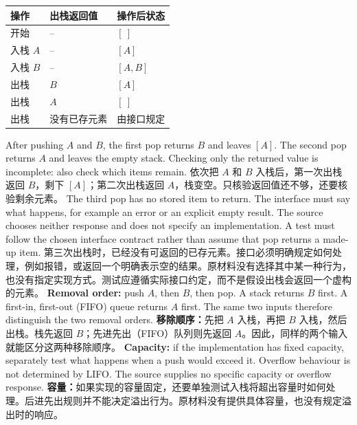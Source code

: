  {\begin{tabularx}{\linewidth}{@{}l l X@{}}\toprule 操作 & 出栈返回值 & 操作后状态\\\midrule
 开始 & -- & $[\ ]$\\
 入栈 $A$ & -- & $[A]$\\
 入栈 $B$ & -- & $[A,B]$\\
 出栈 & $B$ & $[A]$\\
 出栈 & $A$ & $[\ ]$\\
 出栈 & 没有已存元素 & 由接口规定\\\bottomrule\end{tabularx}}
 {After pushing $A$ and $B$, the first pop returns $B$ and leaves $[A]$. The second pop returns $A$ and leaves the empty stack. Checking only the returned value is incomplete: also check which items remain.}
 {依次把 $A$ 和 $B$ 入栈后，第一次出栈返回 $B$，剩下 $[A]$；第二次出栈返回 $A$，栈变空。只核验返回值还不够，还要核验剩余元素。}
 {The third pop has no stored item to return. The interface must say what happens, for example an error or an explicit empty result. The source chooses neither response and does not specify an implementation. A test must follow the chosen interface contract rather than assume that pop returns a made-up item.}
 {第三次出栈时，已经没有可返回的已存元素。接口必须明确规定如何处理，例如报错，或返回一个明确表示空的结果。原材料没有选择其中某一种行为，也没有指定实现方式。测试应遵循实际接口约定，而不是假设出栈会返回一个虚构的元素。}
 {\textbf{Removal order:} push $A$, then $B$, then pop. A stack returns $B$ first. A first-in, first-out (FIFO) queue returns $A$ first. The same two inputs therefore distinguish the two removal orders.}
 {\textbf{移除顺序：}先把 $A$ 入栈，再把 $B$ 入栈，然后出栈。栈先返回 $B$；先进先出（FIFO）队列则先返回 $A$。因此，同样的两个输入就能区分这两种移除顺序。}
 {\textbf{Capacity:} if the implementation has fixed capacity, separately test what happens when a push would exceed it. Overflow behaviour is not determined by LIFO. The source supplies no specific capacity or overflow response.}
 {\textbf{容量：}如果实现的容量固定，还要单独测试入栈将超出容量时如何处理。后进先出规则并不能决定溢出行为。原材料没有提供具体容量，也没有规定溢出时的响应。}

